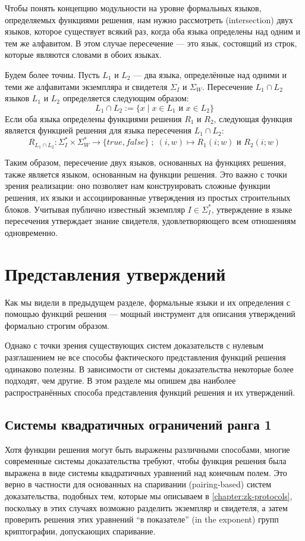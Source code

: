 Чтобы понять концепцию модульности на уровне формальных языков, определяемых функциями решения, нам нужно рассмотреть  (intersection) двух языков, которое существует всякий раз, когда оба языка определены над одним и тем же алфавитом. В этом случае пересечение — это язык, состоящий из строк, которые являются словами в обоих языках.

Будем более точны. Пусть $L_1$ и $L_2$ — два языка, определённые над одними и теми же алфавитами экземпляра и свидетеля $\Sigma_I$ и $\Sigma_W$. Пересечение $L_1 \cap L_2$ языков $L_1$ и $L_2$ определяется следующим образом:
\begin{equation}
L_1 \cap L_2 := \{x\;|\; x\in L_1 \text{ и } x\in L_2\}
\end{equation} 
Если оба языка определены функциями решения $R_1$ и $R_2$, следующая функция является функцией решения для языка пересечения $L_1 \cap L_2$:
\begin{equation}
R_{L_1 \cap L_2}: \Sigma_I^* \times \Sigma_W^* \to \{true, false\}\;;\;
(i,w) \mapsto R_1(i;w) \text{ и } R_2(i;w)
\end{equation}

Таким образом, пересечение двух языков, основанных на функциях решения, также является языком, основанным на функции решения. Это важно с точки зрения реализации: оно позволяет нам конструировать сложные функции решения, их языки и ассоциированные утверждения из простых строительных блоков. Учитывая публично известный экземпляр $I\in \Sigma_I^*$, утверждение в языке пересечения утверждает знание свидетеля, удовлетворяющего всем отношениям одновременно.

\section{Представления утверждений}\label{sec:statement-representations}
Как мы видели в предыдущем разделе, формальные языки и их определения с помощью функций решения — мощный инструмент для описания утверждений формально строгим образом.

Однако с точки зрения существующих систем доказательств с нулевым разглашением не все способы фактического представления функций решения одинаково полезны. В зависимости от системы доказательства некоторые более подходят, чем другие. В этом разделе мы опишем два наиболее распространённых способа представления функций решения и их утверждений.
\subsection{Системы квадратичных ограничений ранга 1}
\label{sec:R1CS}
Хотя функции решения могут быть выражены различными способами, многие современные системы доказательства требуют, чтобы функция решения была выражена в виде системы квадратичных уравнений над конечным полем. Это верно в частности для основанных на спаривании (pairing-based) систем доказательства, подобных тем, которые мы описываем в \chaptname{}  \ref{chapter:zk-protocols}, поскольку в этих случаях возможно разделить экземпляр и свидетеля, а затем проверить решения этих уравнений ``в показателе'' (in the exponent) групп криптографии, допускающих спаривание.

